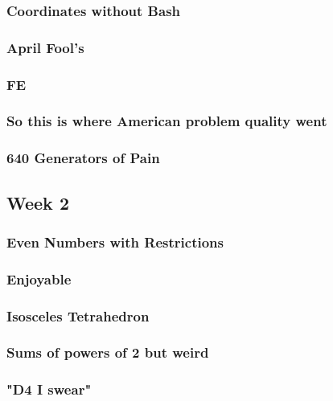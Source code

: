 \documentclass[titlepage=true]{scrartcl}
\begin{document}
    \subsubsection{Coordinates without Bash}
	\label{12.1.3}
	
	\newpage

    \subsubsection{April Fool's}
	\label{12.1.4}
	
	\newpage
	
	\subsubsection{FE}
	\label{12.1.5}
	
	\newpage

	\subsubsection{So this is where American problem quality went}
	\label{12.1.6}
	
	\newpage

	\subsubsection{640 Generators of Pain}
	\label{12.1.7}
	
	\newpage

    \subsection{Week 2}

    \subsubsection{Even Numbers with Restrictions}
	\label{12.2.1}
	
	\newpage
    
    \subsubsection{Enjoyable}
	\label{12.2.2}
	
	\newpage

    \subsubsection{Isosceles Tetrahedron}
	\label{12.2.3}
	
	\newpage

    \subsubsection{Sums of powers of 2 but weird}
	\label{12.2.4}
	
	\newpage

	\subsubsection{"D4 I swear"}
	\label{12.2.5}
	
	\newpage
\end{document}
